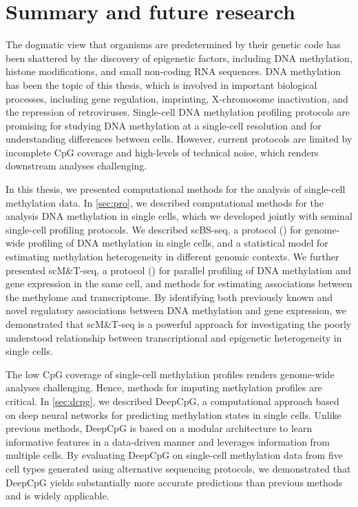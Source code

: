 \chapter{Summary and future research} \label{sec:sum}

\ifpdf
    \graphicspath{{Chapter6/Figs/Raster/}{Chapter6/Figs/PDF/}{Chapter6/Figs/}}
\else
    \graphicspath{{Chapter6/Figs/Vector/}{Chapter6/Figs/}}
\fi

The dogmatic view that organisms are predetermined by their genetic code has been shattered by the discovery of epigenetic factors, including DNA methylation, histone modifications, and small non-coding RNA sequences. DNA methylation has been the topic of this thesis, which is involved in important biological processes, including gene regulation, imprinting, X-chromosome inactivation, and the repression of retroviruses. Single-cell DNA methylation profiling protocols are promising for studying DNA methylation at a single-cell resolution and for understanding differences between cells. However, current protocols are limited by incomplete CpG coverage and high-levels of technical noise, which renders downstream analyses challenging.

In this thesis, we presented computational methods for the analysis of single-cell methylation data. In \cref{sec:pro}, we described computational methods for the analysis DNA methylation in single cells, which we developed jointly with seminal single-cell profiling protocols. We described scBS-seq, a protocol () for genome-wide profiling of DNA methylation in single cells, and a statistical model for estimating methylation heterogeneity in different genomic contexts. We further presented scM\&T-seq, a protocol () for parallel profiling of DNA methylation and gene expression in the same cell, and methods for estimating associations between the methylome and transcriptome. By identifying both previously known and novel regulatory associations between DNA methylation and gene expression, we demonstrated that scM\&T-seq is a powerful approach for investigating the poorly understood relationship between transcriptional and epigenetic heterogeneity in single cells.

The low CpG coverage of single-cell methylation profiles renders genome-wide analyses challenging. Hence, methods for imputing methylation profiles are critical. In \cref{sec:dcpg}, we described DeepCpG, a computational approach based on deep neural networks for predicting methylation states in single cells. Unlike previous methods, DeepCpG is based on a modular architecture to learn informative features in a data-driven manner and leverages information from multiple cells. By evaluating DeepCpG on single-cell methylation data from five cell types generated using alternative sequencing protocols, we demonstrated that DeepCpG yields substantially more accurate predictions than previous methods and is widely applicable.


